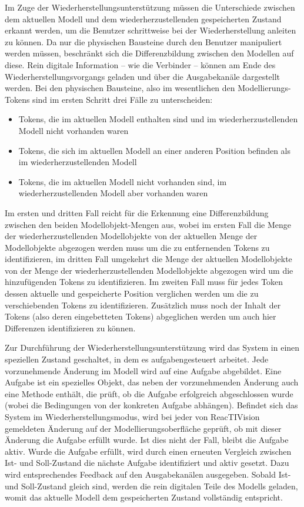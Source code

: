 Im Zuge der Wiederherstellungsunterstützung müssen die Unterschiede zwischen dem aktuellen Modell und dem wiederherzustellenden gespeicherten Zustand erkannt werden, um die Benutzer schrittweise bei der Wiederherstellung anleiten zu können. Da nur die physischen Bausteine durch den Benutzer manipuliert werden müssen, beschränkt sich die Differenzbildung zwischen den Modellen auf diese. Rein digitale Information -- wie die Verbinder -- können am Ende des Wiederherstellungsvorgangs geladen und über die Ausgabekanäle dargestellt werden. Bei den physischen Bausteine, also im wesentlichen den Modellierungs-Tokens sind im ersten Schritt drei Fälle zu unterscheiden:
\begin{itemize}
	\item Tokens, die im aktuellen Modell enthalten sind und im wiederherzustellenden Modell nicht vorhanden waren
	\item Tokens, die sich im aktuellen Modell an einer anderen Position befinden als im wiederherzustellenden Modell
	\item Tokens, die im aktuellen Modell nicht vorhanden sind, im wiederherzustellenden Modell aber vorhanden waren
\end{itemize}
Im ersten und dritten Fall reicht für die Erkennung eine Differenzbildung zwischen den beiden Modellobjekt-Mengen aus, wobei im ersten Fall die Menge der wiederherzustellenden Modellobjekte von der aktuellen Menge der Modellobjekte abgezogen werden muss um die zu entfernenden Tokens zu identifizieren, im dritten Fall umgekehrt die Menge der aktuellen Modellobjekte von der Menge der wiederherzustellenden Modellobjekte abgezogen wird um die hinzufügenden Tokens zu identifizieren. Im zweiten Fall muss für jedes Token dessen aktuelle und gespeicherte Position verglichen werden um die zu verschiebenden Tokens zu identifizieren. Zusätzlich muss noch der Inhalt der Tokens (also deren eingebetteten Tokens) abgeglichen werden um auch hier Differenzen identifizieren zu können.

Zur Durchführung der Wiederherstellungsunterstützung wird das System in einen speziellen Zustand geschaltet, in dem es aufgabengesteuert arbeitet. Jede vorzunehmende Änderung im Modell wird auf eine Aufgabe abgebildet. Eine Aufgabe ist ein spezielles Objekt, das neben der vorzunehmenden Änderung auch eine Methode enthält, die prüft, ob die Aufgabe erfolgreich abgeschlossen wurde (wobei die Bedingungen von der konkreten Aufgabe abhängen). Befindet sich das System im Wiederherstellungsmodus, wird bei jeder von ReacTIVision gemeldeten Änderung auf der Modellierungsoberfläche geprüft, ob mit dieser Änderung die Aufgabe erfüllt wurde. Ist dies nicht der Fall, bleibt die Aufgabe aktiv. Wurde die Aufgabe erfüllt, wird durch einen erneuten Vergleich zwischen Ist- und Soll-Zustand die nächste Aufgabe identifiziert und aktiv gesetzt. Dazu wird entsprechendes Feedback auf den Ausgabekanälen ausgegeben. Sobald Ist- und Soll-Zustand gleich sind, werden die rein digitalen Teile des Modells geladen, womit das aktuelle Modell dem gespeicherten Zustand vollständig entspricht. 

